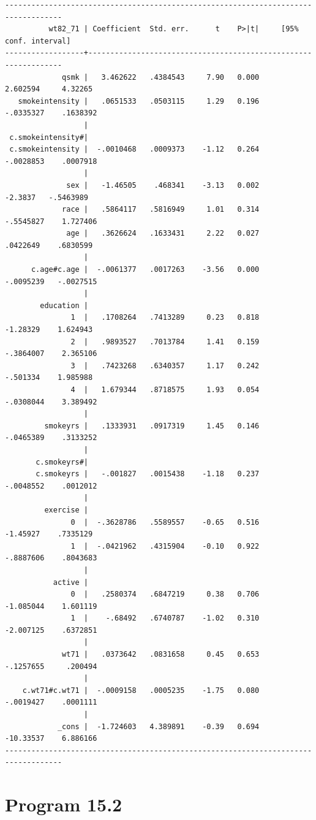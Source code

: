 \documentclass[
  10pt,
  a4paper,
]{book}
\begin{document}
\begin{verbatim}
-----------------------------------------------------------------------------------
          wt82_71 | Coefficient  Std. err.      t    P>|t|     [95% conf. interval]
------------------+----------------------------------------------------------------
             qsmk |   3.462622   .4384543     7.90   0.000     2.602594     4.32265
   smokeintensity |   .0651533   .0503115     1.29   0.196    -.0335327    .1638392
                  |
 c.smokeintensity#|
 c.smokeintensity |  -.0010468   .0009373    -1.12   0.264    -.0028853    .0007918
                  |
              sex |   -1.46505    .468341    -3.13   0.002      -2.3837   -.5463989
             race |   .5864117   .5816949     1.01   0.314    -.5545827    1.727406
              age |   .3626624   .1633431     2.22   0.027     .0422649    .6830599
                  |
      c.age#c.age |  -.0061377   .0017263    -3.56   0.000    -.0095239   -.0027515
                  |
        education |
               1  |   .1708264   .7413289     0.23   0.818     -1.28329    1.624943
               2  |   .9893527   .7013784     1.41   0.159    -.3864007    2.365106
               3  |   .7423268   .6340357     1.17   0.242     -.501334    1.985988
               4  |   1.679344   .8718575     1.93   0.054    -.0308044    3.389492
                  |
         smokeyrs |   .1333931   .0917319     1.45   0.146    -.0465389    .3133252
                  |
       c.smokeyrs#|
       c.smokeyrs |   -.001827   .0015438    -1.18   0.237    -.0048552    .0012012
                  |
         exercise |
               0  |  -.3628786   .5589557    -0.65   0.516     -1.45927    .7335129
               1  |  -.0421962   .4315904    -0.10   0.922    -.8887606    .8043683
                  |
           active |
               0  |   .2580374   .6847219     0.38   0.706    -1.085044    1.601119
               1  |    -.68492   .6740787    -1.02   0.310    -2.007125    .6372851
                  |
             wt71 |   .0373642   .0831658     0.45   0.653    -.1257655     .200494
                  |
    c.wt71#c.wt71 |  -.0009158   .0005235    -1.75   0.080    -.0019427    .0001111
                  |
            _cons |  -1.724603   4.389891    -0.39   0.694    -10.33537    6.886166
-----------------------------------------------------------------------------------
\end{verbatim}

\section{Program 15.2}\label{program-15.2-1}
\end{document}
